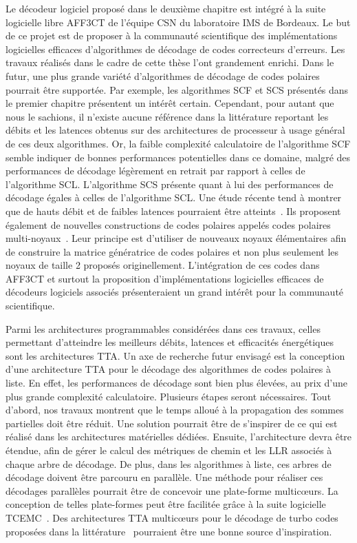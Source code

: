 Le décodeur logiciel proposé dans le deuxième chapitre est intégré à la suite logicielle libre AFF3CT de l'équipe CSN du laboratoire IMS de Bordeaux. Le but de ce projet est de proposer à la communauté scientifique des implémentations logicielles efficaces d'algorithmes de décodage de codes correcteurs d'erreurs. Les travaux réalisés dans le cadre de cette thèse l'ont grandement enrichi. Dans le futur, une plus grande variété d'algorithmes de décodage de codes polaires pourrait être supportée. Par exemple, les algorithmes SCF et SCS présentés dans le premier chapitre présentent un intérêt certain. Cependant, pour autant que nous le sachions, il n'existe aucune référence dans la littérature reportant les débits et les latences obtenus sur des architectures de processeur à usage général de ces deux algorithmes. Or, la faible complexité calculatoire de l'algorithme SCF semble indiquer de bonnes performances potentielles dans ce domaine, malgré des performances de décodage légèrement en retrait par rapport à celles de l'algorithme SCL. L'algorithme SCS présente quant à lui des performances de décodage égales à celles de l'algorithme SCL. Une étude récente tend à montrer que de hauts débit et de faibles latences pourraient être atteints~\cite{8351832}. Ils proposent également de nouvelles constructions de codes polaires appelés codes polaires multi-noyaux~\cite{7962750,8254147}. Leur principe est d'utiliser de nouveaux noyaux élémentaires afin de construire la matrice génératrice de codes polaires et non plus seulement les noyaux de taille 2 proposés originellement. L'intégration de ces codes dans AFF3CT et surtout la proposition d'implémentations logicielles efficaces de décodeurs logiciels associés présenteraient un grand intérêt pour la communauté scientifique.

Parmi les architectures programmables considérées dans ces travaux, celles permettant d'atteindre les meilleurs débits, latences et efficacités énergétiques sont les architectures TTA.
Un axe de recherche futur envisagé est la conception d'une architecture TTA pour le décodage des algorithmes de codes polaires à liste.
En effet, les performances de décodage sont bien plus élevées, au prix d'une plus grande complexité calculatoire.
Plusieurs étapes seront nécessaires. Tout d'abord, nos travaux montrent que le temps alloué à la propagation des sommes partielles doit être réduit.
Une solution pourrait être de s'inspirer de ce qui est réalisé dans les architectures matérielles dédiées.
Ensuite, l'architecture devra être étendue, afin de gérer le calcul des métriques de chemin et les LLR associés à chaque arbre de décodage. De plus, dans les algorithmes à liste, ces arbres de décodage doivent être parcouru en parallèle. Une méthode pour réaliser ces décodages parallèles pourrait être de concevoir une plate-forme multicœurs. La conception de telles plate-formes peut être facilitée grâce à la suite logicielle TCEMC~\cite{tcemc_2011}. Des architectures TTA multicœurs pour le décodage de turbo codes proposées dans la littérature~\cite{kultala_turbo_2013} pourraient être une bonne source d'inspiration.

